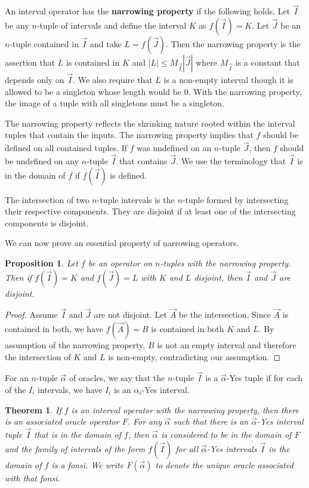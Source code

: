 \documentclass[12pt]{article}
\newtheorem{theorem}{Theorem}[subsection]
\newtheorem{proposition}{Proposition}[subsection]
\theoremstyle{remark}
\begin{document}
An interval operator has the \textbf{narrowing property} if the following holds. Let $\vec{I}$ be any $n$-tuple of intervals and define the interval $K$ as $f(\vec{I}) = K$. Let $\vec{J}$ be an $n$-tuple contained in $\vec{I}$ and take $L= f(\vec{J})$. Then the narrowing property is the assertion that $L$ is contained in $K$ and $|L| \leq M_{\vec{I}} |\vec{J}|$ where $M_{\vec{I}}$ is a constant that depends only on $\vec{I}$. We also require that $L$ is a non-empty interval though it is allowed to be a singleton whose length would be 0. With the narrowing property, the image of a tuple with all singletons must be a singleton. 

The narrowing property reflects the shrinking nature rooted within the interval tuples that contain the inputs. The narrowing property implies that $f$ should be defined on all contained tuples. If $f$ was undefined on an $n$-tuple $\vec{J}$, then $f$ should be undefined on any $n$-tuple $\vec{I}$ that contains $\vec{J}$. We use the terminology that $\vec{I}$ is in the domain of $f$ if $f(\vec{I})$ is defined. 

The intersection of two $n$-tuple intervals is the $n$-tuple formed by intersecting their respective components. They are disjoint if at least one of the intersecting components is disjoint. 

We can now prove an essential property of narrowing operators. 

\begin{proposition} \label{pr:op-nrw}
Let $f$ be an operator on $n$-tuples with the narrowing property. Then if $f(\vec{I})=K$ and $f(\vec{J}) = L$ with $K$ and $L$ disjoint, then $\vec{I}$ and $\vec{J}$ are disjoint.
\end{proposition}

\begin{proof}
Assume $\vec{I}$ and $\vec{J}$ are not disjoint. Let $\vec{A}$ be the intersection. Since $\vec{A}$ is contained in both, we have $f(\vec A)= B$ is contained in both $K$ and $L$. By assumption of the narrowing property, $B$ is not an empty interval and therefore the intersection of $K$ and $L$ is non-empty, contradicting our assumption. 
\end{proof}

For an $n$-tuple $\vec{\alpha}$ of oracles, we say that the $n$-tuple $\vec{I}$ is a $\vec{\alpha}$-Yes tuple if for each of the $I_i$ intervals, we have $I_i$ is an $\alpha_i$-Yes interval. 

\begin{theorem}
If $f$ is an interval operator with the narrowing property, then there is an associated oracle operator $F$. For any $\vec{\alpha}$ such that there is an $\vec{\alpha}$-Yes interval tuple $\vec{I}$ that is in the domain of 
$f$, then $\vec{\alpha}$ is considered to be in the domain of $F$ and the family of intervals of the form $f(\vec{I})$ for all $\vec{\alpha}$-Yes intervals $\vec{I}$ in the domain of $f$ is a fonsi. We write $F(\vec{\alpha})$ to denote the unique oracle associated with that fonsi. 
\end{theorem}
\end{document}
